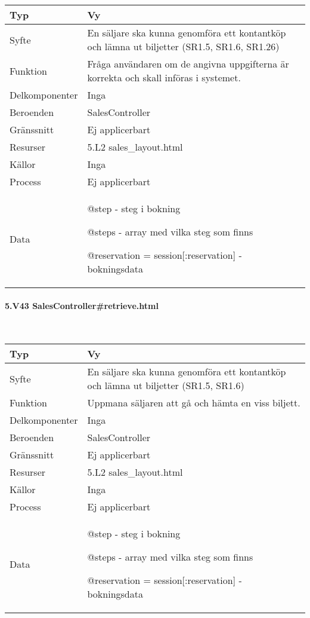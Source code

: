 \documentclass[a4paper, twoside, 11pt, titlepage]{article}
\begin{document}
			\begin {table} [ht] \begin{tabular} {  p{3.5cm} p{9.6cm} }
				\hline
				{Typ} & {Vy} \\
				\hline
				{Syfte} & {En säljare ska kunna genomföra ett kontantköp och lämna ut biljetter (SR1.5, SR1.6, SR1.26)} \\
				\hline
				{Funktion} & {Fråga användaren om de angivna uppgifterna är korrekta och skall införas i systemet.} \\
				\hline
				{Delkomponenter} & {Inga} \\
				\hline
				{Beroenden} & {SalesController} \\
				\hline
				{Gränssnitt} & {Ej applicerbart} \\
				\hline
				{Resurser} & {5.L2 sales\_layout.html} \\
				\hline
				{Källor} & {Inga} \\
				\hline
				{Process} & {Ej applicerbart} \\
				\hline
				{Data} & {@step - steg i bokning

@steps - array med vilka steg som finns

@reservation = session[:reservation] - bokningsdata} \\
				\hline
			\end{tabular} \end{table} \FloatBarrier


			\paragraph{5.V43 SalesController\#retrieve.html}\

			\begin {table} [ht] \begin{tabular} {  p{3.5cm} p{9.6cm} }
				\hline
				{Typ} & {Vy} \\
				\hline
				{Syfte} & {En säljare ska kunna genomföra ett kontantköp och lämna ut biljetter (SR1.5, SR1.6)} \\
				\hline
				{Funktion} & {Uppmana säljaren att gå och hämta en viss biljett.} \\
				\hline
				{Delkomponenter} & {Inga} \\
				\hline
				{Beroenden} & {SalesController} \\
				\hline
				{Gränssnitt} & {Ej applicerbart} \\
				\hline
				{Resurser} & {5.L2 sales\_layout.html} \\
				\hline
				{Källor} & {Inga} \\
				\hline
				{Process} & {Ej applicerbart} \\
				\hline
				{Data} & {@step - steg i bokning

@steps - array med vilka steg som finns

@reservation = session[:reservation] - bokningsdata} \\
				\hline
			\end{tabular} \end{table} \FloatBarrier
\end{document}
